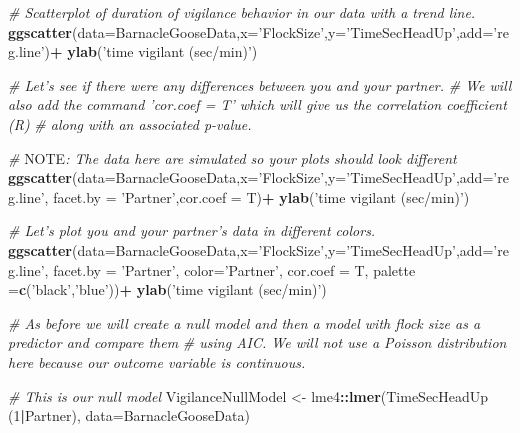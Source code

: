 \documentclass[]{book}
\newenvironment{Shaded}{\begin{snugshade}}{\end{snugshade}}
\newcommand{\AlertTok}[1]{\textcolor[rgb]{0.94,0.16,0.16}{#1}}
\newcommand{\CommentTok}[1]{\textcolor[rgb]{0.56,0.35,0.01}{\textit{#1}}}
\newcommand{\DataTypeTok}[1]{\textcolor[rgb]{0.13,0.29,0.53}{#1}}
\newcommand{\DecValTok}[1]{\textcolor[rgb]{0.00,0.00,0.81}{#1}}
\newcommand{\KeywordTok}[1]{\textcolor[rgb]{0.13,0.29,0.53}{\textbf{#1}}}
\newcommand{\NormalTok}[1]{#1}
\newcommand{\OperatorTok}[1]{\textcolor[rgb]{0.81,0.36,0.00}{\textbf{#1}}}
\newcommand{\StringTok}[1]{\textcolor[rgb]{0.31,0.60,0.02}{#1}}
\begin{document}
\begin{Shaded}
\begin{Highlighting}[]
\CommentTok{# Scatterplot of duration of vigilance behavior in our data with a trend line.}
\KeywordTok{ggscatter}\NormalTok{(}\DataTypeTok{data=}\NormalTok{BarnacleGooseData,}\DataTypeTok{x=}\StringTok{'FlockSize'}\NormalTok{,}\DataTypeTok{y=}\StringTok{'TimeSecHeadUp'}\NormalTok{,}\DataTypeTok{add=}\StringTok{'reg.line'}\NormalTok{)}\OperatorTok{+}
\StringTok{  }\KeywordTok{ylab}\NormalTok{(}\StringTok{'time vigilant (sec/min)'}\NormalTok{)}


\CommentTok{# Let's see if there were any differences between you and your partner. }
\CommentTok{# We will also add the command 'cor.coef = T' which will give us the correlation coefficient (R) }
\CommentTok{# along with an associated p-value.}

\CommentTok{# }\AlertTok{NOTE}\CommentTok{: The data here are simulated so your plots should look different}
\KeywordTok{ggscatter}\NormalTok{(}\DataTypeTok{data=}\NormalTok{BarnacleGooseData,}\DataTypeTok{x=}\StringTok{'FlockSize'}\NormalTok{,}\DataTypeTok{y=}\StringTok{'TimeSecHeadUp'}\NormalTok{,}\DataTypeTok{add=}\StringTok{'reg.line'}\NormalTok{,}
          \DataTypeTok{facet.by =} \StringTok{'Partner'}\NormalTok{,}\DataTypeTok{cor.coef =}\NormalTok{ T)}\OperatorTok{+}
\StringTok{  }\KeywordTok{ylab}\NormalTok{(}\StringTok{'time vigilant (sec/min)'}\NormalTok{)}


\CommentTok{# Let's plot you and your partner's data in different colors. }
\KeywordTok{ggscatter}\NormalTok{(}\DataTypeTok{data=}\NormalTok{BarnacleGooseData,}\DataTypeTok{x=}\StringTok{'FlockSize'}\NormalTok{,}\DataTypeTok{y=}\StringTok{'TimeSecHeadUp'}\NormalTok{,}\DataTypeTok{add=}\StringTok{'reg.line'}\NormalTok{,}
          \DataTypeTok{facet.by =} \StringTok{'Partner'}\NormalTok{, }\DataTypeTok{color=}\StringTok{'Partner'}\NormalTok{, }\DataTypeTok{cor.coef =}\NormalTok{ T,}
          \DataTypeTok{palette =}\KeywordTok{c}\NormalTok{(}\StringTok{'black'}\NormalTok{,}\StringTok{'blue'}\NormalTok{))}\OperatorTok{+}
\StringTok{  }\KeywordTok{ylab}\NormalTok{(}\StringTok{'time vigilant (sec/min)'}\NormalTok{)}

\CommentTok{# As before we will create a null model and then a model with flock size as a predictor and compare them}
\CommentTok{# using AIC. We will not use a Poisson distribution here because our outcome variable is continuous.}

\CommentTok{# This is our null model}
\NormalTok{VigilanceNullModel <-}\StringTok{ }\NormalTok{lme4}\OperatorTok{::}\KeywordTok{lmer}\NormalTok{(TimeSecHeadUp }\OperatorTok{~}\StringTok{ }\NormalTok{(}\DecValTok{1}\OperatorTok{|}\NormalTok{Partner), }\DataTypeTok{data=}\NormalTok{BarnacleGooseData)}


\end{Highlighting}
\end{Shaded}
\end{document}
